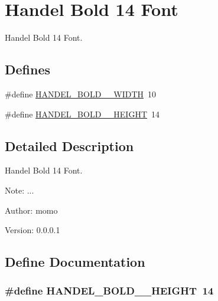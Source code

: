 \hypertarget{group__graphic__device__font__handel14}{
\section{Handel Bold 14 Font}
\label{group__graphic__device__font__handel14}
}
Handel Bold 14 Font.  


\subsection*{Defines}
\begin{CompactItemize}
\item 
\#define \hyperlink{group__graphic__device__font__handel14_g46d2b848919d2bff5c7ea89189328490}{HANDEL\_\-BOLD\_\_\-WIDTH}~10
\item 
\#define \hyperlink{group__graphic__device__font__handel14_g2ff4d08a2a86ff88b59f050e0a41d31c}{HANDEL\_\-BOLD\_\_\-HEIGHT}~14
\end{CompactItemize}


\subsection{Detailed Description}
Handel Bold 14 Font. 

\begin{Desc}
\item[Note:]... \end{Desc}
\begin{Desc}
\item[Author:]momo \end{Desc}
\begin{Desc}
\item[Version:]0.0.0.1 \end{Desc}


\subsection{Define Documentation}
\hypertarget{group__graphic__device__font__handel14_g2ff4d08a2a86ff88b59f050e0a41d31c}{
\subsubsection[{HANDEL\_\-BOLD\_\-14\_\-HEIGHT}]{\setlength{\rightskip}{0pt plus 5cm}\#define HANDEL\_\-BOLD\_\_\-HEIGHT~14}}
\label{group__graphic__device__font__handel14_g2ff4d08a2a86ff88b59f050e0a41d31c}


